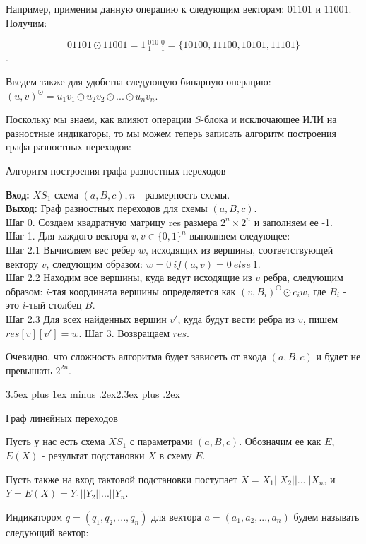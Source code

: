\documentclass[a4paper,12pt]{report}
\makeatletter
\theoremstyle{plain} %
\theoremstyle{definition}
\theoremstyle{remark}
\renewcommand{\section}{\@startsection{section}{1}{18pt}%
{3.5ex plus 1ex minus .2ex}{2.3ex plus .2ex}%
{\normalfont\Large\bfseries\raggedright}}%
\makeatother
\begin{document}
\begin{large}
Например, применим данную операцию к следующим векторам: 01101 и 11001. Получим:

$$01101 \odot 11001 = 1~_{1}^010~_{1}^0 = \{10100, 11100, 10101, 11101\}$$.

Введем также для удобства следующую бинарную операцию: $(u, v)^{\odot} = u_1v_1 \odot u_2v_2 \odot ... \odot u_nv_n$.

Поскольку мы знаем, как влияют операции $S$-блока и исключающее ИЛИ на разностные индикаторы, то мы можем теперь записать алгоритм построения графа разностных переходов:

\begin{algorithm}[H]
\caption{Алгоритм построения графа разностных переходов}
\label{diff_graph_construct}
\textbf{Вход:} $XS_1$-схема $(a, B, c), n$ - размерность схемы.\\
\textbf{Выход:} Граф разностных переходов для схемы $(a, B, c)$.\\
Шаг 0. Создаем квадратную матрицу res размера $2^n \times 2^n$ и заполняем ее -1. \\
Шаг 1. Для каждого вектора $v, v \in \{0, 1\}^n$ выполняем следующее: \\
Шаг 2.1 Вычисляем вес ребер $w$, исходящих из вершины, соответствующей вектору $v$, следующим образом: $w = 0~ if (a,v) = 0 ~else ~1$.\\
Шаг 2.2 Находим все вершины, куда ведут исходящие из $v$ ребра, следующим образом: $i$-тая координата вершины определяется как $(v, B_i)^{\odot} \odot c_iw$, где $B_i$ - это $i$-тый столбец $B$. \\
Шаг 2.3 Для всех найденных вершин $v'$, куда будут вести ребра из $v$, пишем $res[v][v'] = w$.
Шаг 3. Возвращаем $res$.\\
\end{algorithm}

Очевидно, что сложность алгоритма будет зависеть от входа $(a,B,c)$ и будет не превышать $2^{2n}$.

\section{Граф линейных переходов}

Пусть у нас есть схема $XS_1$ с параметрами $(a, B, c)$. Обозначим ее как $E$,  $E(X)$ - результат подстановки $X$ в схему $E$. 

Пусть также на вход тактовой подстановки поступает $X = X_1||X_2||...||X_n$, и $Y=E(X) = Y_1||Y_2||...||Y_n$.

Индикатором $q = (q_1, q_2, ..., q_n)$ для вектора $a=(a_1, a_2, ..., a_n)$ будем называть следующий вектор:


\end{large}
\end{document}
